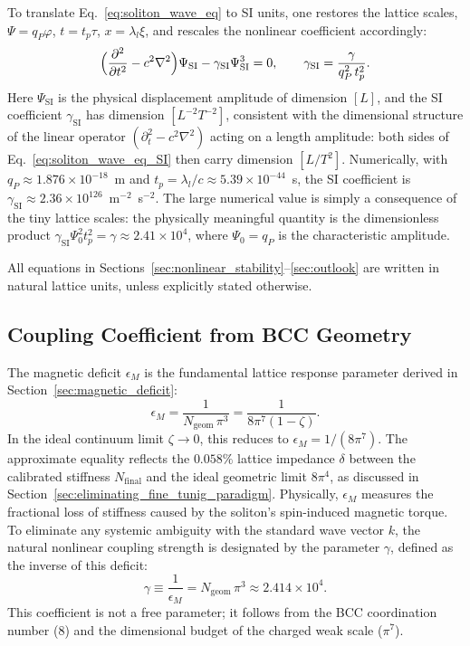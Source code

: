 \documentclass[10pt,a4paper]{article}
\begin{document}
To translate Eq.~\eqref{eq:soliton_wave_eq} to SI units, one restores
the lattice scales, $\Psi = q_P\varphi$, $t = t_p\tau$, $x =
\lambda_l\xi$, and rescales the nonlinear coefficient accordingly:
\begin{equation}
	\Bigl( \frac{\partial^{2}}{\partial t^{2}} - c^{2}\nabla^{2} \Bigr)
	\Psi_{\mathrm{SI}}
	- \gamma_{\mathrm{SI}} \Psi_{\mathrm{SI}}^3 = 0 ,
	\qquad
	\gamma_{\mathrm{SI}} = \frac{\gamma}{q_P^2\,t_p^2}.
	\label{eq:soliton_wave_eq_SI}
\end{equation}
Here $\Psi_{\mathrm{SI}}$ is the physical displacement amplitude of
dimension $[L]$, and the SI coefficient $\gamma_{\mathrm{SI}}$ has
dimension $[L^{-2}T^{-2}]$, consistent with the dimensional structure
of the linear operator $(\partial_t^2 - c^2\nabla^2)$ acting on a
length amplitude: both sides of Eq.~\eqref{eq:soliton_wave_eq_SI} then
carry dimension $[L/T^2]$. Numerically, with $q_P \approx 1.876 \times
10^{-18}$~m and $t_p = \lambda_l/c \approx 5.39 \times 10^{-44}$~s,
the SI coefficient is $\gamma_{\mathrm{SI}} \approx 2.36 \times
10^{126}$~m$^{-2}$~s$^{-2}$. The large numerical value is simply a
consequence of the tiny lattice scales: the physically meaningful
quantity is the dimensionless product $\gamma_{\mathrm{SI}}\Psi_0^2
t_p^2 = \gamma \approx 2.41 \times 10^4$, where $\Psi_0 = q_P$ is the
characteristic amplitude.

All equations in Sections~\ref{sec:nonlinear_stability}--\ref{sec:outlook}
are written in natural lattice units, unless explicitly stated
otherwise.

\subsection{Coupling Coefficient from BCC Geometry}

The magnetic deficit $\epsilon_{M}$ is the fundamental lattice response
parameter derived in Section~\ref{sec:magnetic_deficit}:
\begin{equation}\label{eq:epsM_stability}
	\epsilon_{M} = \frac{1}{N_{\text{geom}}\,\pi^{3}}
	= \frac{1}{8\pi^{7}(1-\zeta)} .
\end{equation}
In the ideal continuum limit \(\zeta\to 0\), this reduces to \(\epsilon_M = 1/(8\pi^7)\).
The approximate equality reflects the $0.058\%$ lattice impedance $\delta$
between the calibrated stiffness $N_{\text{final}}$ and the ideal geometric
limit $8\pi^{4}$, as discussed in
Section~\ref{sec:eliminating_fine_tunig_paradigm}.  Physically, $\epsilon_{M}$
measures the fractional loss of stiffness caused by the soliton's spin-induced
magnetic torque. To eliminate any systemic ambiguity with the standard wave
vector $k$, the natural nonlinear coupling strength is designated by the
parameter $\gamma$, defined as the inverse of this deficit:
\begin{equation}\label{eq:gamma_coeff}
	\gamma \equiv \frac{1}{\epsilon_{M}}
	= N_{\text{geom}}\,\pi^{3} \approx 2.414 \times 10^{4}.
\end{equation}
This coefficient is not a free parameter; it follows from the BCC coordination
number (8) and the dimensional budget of the charged weak scale ($\pi^{7}$).
\end{document}
